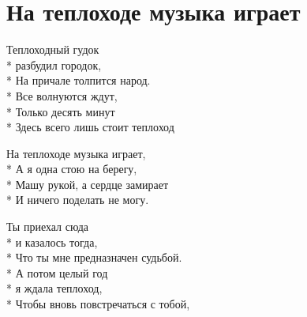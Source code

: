 \vspace{\fill}\newpage

\section{На теплоходе музыка играет}
\label{song:На_теплоходе_музыка_играет}

\medskip

\begin{minipage}{\linewidth}
Теплоходный гудок\\*
разбудил городок,\\*
На причале толпится народ.\\*
Все волнуются ждут,\\*
Только десять минут\\*
Здесь всего лишь стоит теплоход\\
\end{minipage}\par\medskip\nobreak

\medskip

\begin{minipage}{\linewidth}
\hspace*{1.5em}На теплоходе музыка играет,\\*
\hspace*{1.5em}А я одна стою на берегу,\\*
\hspace*{1.5em}Машу рукой, а сердце замирает\\*
\hspace*{1.5em}И ничего поделать не могу.\\
\end{minipage}\par\medskip\nobreak

\medskip

\begin{minipage}{\linewidth}
Ты приехал сюда\\*
и казалось тогда,\\*
Что ты мне предназначен судьбой.\\*
А потом целый год\\*
я ждала теплоход,\\*
Чтобы вновь повстречаться с тобой,\\
\end{minipage}\par\medskip\nobreak

